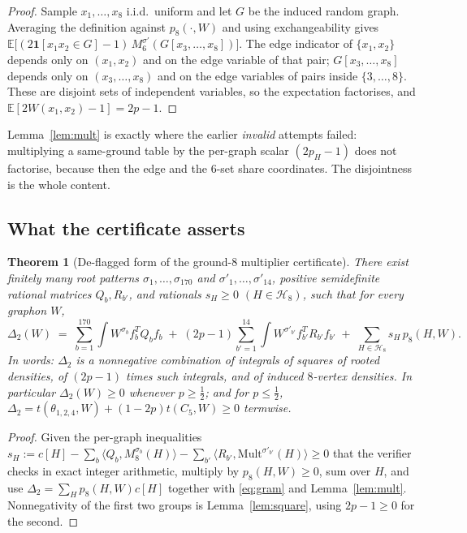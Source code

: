 \documentclass[11pt]{article}
\newtheorem{theorem}{Theorem}[section]
\theoremstyle{definition}
\newcommand{\E}{\mathbb E}
\newcommand{\thet}{\theta_{1,2,4}}
\begin{document}
\begin{proof}
Sample $x_1,\dots,x_8$ i.i.d.\ uniform and let $G$ be the induced random graph.
Averaging the definition against $p_8(\cdot,W)$ and using exchangeability gives
$\E\big[(2\mathbf 1[x_1x_2\in G]-1)\,M^{\sigma'}_6(G[x_3,\dots,x_8])\big]$.  The
edge indicator of $\{x_1,x_2\}$ depends only on $(x_1,x_2)$ and on the edge
variable of that pair; $G[x_3,\dots,x_8]$ depends only on $(x_3,\dots,x_8)$ and
on the edge variables of pairs inside $\{3,\dots,8\}$.  These are disjoint sets
of independent variables, so the expectation factorises, and
$\E[2W(x_1,x_2)-1]=2p-1$.
\end{proof}

Lemma~\ref{lem:mult} is exactly where the earlier \emph{invalid} attempts
failed: multiplying a same-ground table by the per-graph scalar $(2p_H-1)$ does
not factorise, because then the edge and the $6$-set share coordinates.  The
disjointness is the whole content.

\subsection{What the certificate asserts}

\begin{theorem}[De-flagged form of the ground-$8$ multiplier certificate]
\label{thm:deflag}
There exist finitely many root patterns $\sigma_1,\dots,\sigma_{170}$ and
$\sigma'_1,\dots,\sigma'_{14}$, positive semidefinite rational matrices
$Q_b,R_{b'}$, and rationals $s_H\ge0$ $(H\in\mathcal H_8)$, such that for every
graphon $W$,
\begin{equation}\label{eq:deflagged}
  \Delta_2(W)\;=\;
  \sum_{b=1}^{170}\int W^{\sigma_b}f_{b}^{T}Q_bf_{b}
  \;+\;(2p-1)\sum_{b'=1}^{14}\int W^{\sigma'_{b'}}f_{b'}^{T}R_{b'}f_{b'}
  \;+\;\sum_{H\in\mathcal H_8}s_H\,p_8(H,W).
\end{equation}
In words: \emph{$\Delta_2$ is a nonnegative combination of integrals of squares
of rooted densities, of $(2p-1)$ times such integrals, and of induced
$8$-vertex densities.}  In particular $\Delta_2(W)\ge0$ whenever $p\ge\tfrac12$;
and for $p\le\tfrac12$, $\Delta_2=t(\thet,W)+(1-2p)t(C_5,W)\ge0$ termwise.
\end{theorem}

\begin{proof}
Given the per-graph inequalities $s_H:=c[H]-\sum_b\langle
Q_b,M^{\sigma_b}_8(H)\rangle-\sum_{b'}\langle
R_{b'},\mathrm{Mult}^{\sigma'_{b'}}(H)\rangle\ge0$ that the verifier checks in
exact integer arithmetic, multiply by $p_8(H,W)\ge0$, sum over $H$, and use
$\Delta_2=\sum_Hp_8(H,W)c[H]$ together with \eqref{eq:gram} and
Lemma~\ref{lem:mult}.  Nonnegativity of the first two groups is
Lemma~\ref{lem:square}, using $2p-1\ge0$ for the second.
\end{proof}
\end{document}
